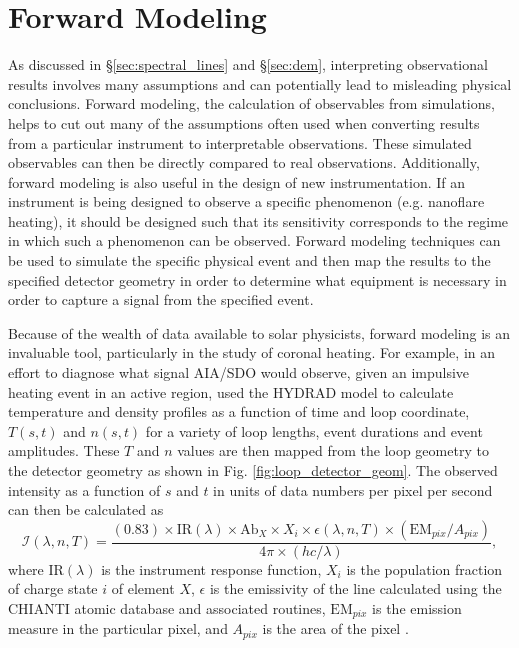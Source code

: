 \section{Forward Modeling}
\label{sec:charge_state}
%
\par As discussed in \S\ref{sec:spectral_lines} and \S\ref{sec:dem}, interpreting observational results involves many assumptions and can potentially lead to misleading physical conclusions. Forward modeling, the calculation of observables from simulations, helps to cut out many of the assumptions often used when converting results from a particular instrument to interpretable observations. These simulated observables can then be directly compared to real observations. Additionally, forward modeling is also useful in the design of new instrumentation. If an instrument is being designed to observe a specific phenomenon (e.g. nanoflare heating), it should be designed such that its sensitivity corresponds to the regime in which such a phenomenon can be observed. Forward modeling techniques can be used to simulate the specific physical event and then map the results to the specified detector geometry in order to determine what equipment is necessary in order to capture a signal from the specified event.
%
\par Because of the wealth of data available to solar physicists, forward modeling is an invaluable tool, particularly in the study of coronal heating. For example, in an effort to diagnose what signal AIA/SDO would observe, given an impulsive heating event in an active region, \citet{bradshaw_what_2011} used the HYDRAD model \citep{bradshaw_influence_2013} to calculate temperature and density profiles as a function of time and loop coordinate, $T(s,t)$ and $n(s,t)$ for a variety of loop lengths, event durations and event amplitudes. These $T$ and $n$ values are then mapped from the loop geometry to the detector geometry as shown in Fig. \ref{fig:loop_detector_geom}. The observed intensity as a function of $s$ and $t$ in units of data numbers per pixel per second can then be calculated as
\begin{equation}
	\mathcal{I}(\lambda,n,T)=\frac{(0.83)\times\mathrm{IR}(\lambda)\times\mathrm{Ab}_X\times X_i\times\epsilon(\lambda,n,T)\times(\mathrm{EM}_{pix}/A_{pix})}{4\pi\times(hc/\lambda)},
	\label{eq:fm_intensity}
\end{equation}
where $\mathrm{IR}(\lambda)$ is the instrument response function, $X_i$ is the population fraction of charge state $i$ of element $X$, $\epsilon$ is the emissivity of the line calculated using the CHIANTI atomic database and associated routines, $\mathrm{EM}_{pix}$ is the emission measure in the particular pixel, and $A_{pix}$ is the area of the pixel \citep{bradshaw_what_2011}.

